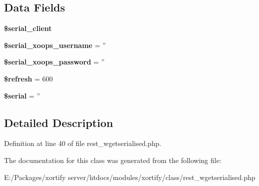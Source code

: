 \subsection*{Data Fields}
\begin{DoxyCompactItemize}
\item 
\hypertarget{class_r_e_s_t___w_g_e_t_s_e_r_i_a_l_i_s_e_d_xortify_exchange_a3fb0b95d3934fcbf11c3ff858232e6cf}{{\bfseries \$serial\-\_\-client}}\label{class_r_e_s_t___w_g_e_t_s_e_r_i_a_l_i_s_e_d_xortify_exchange_a3fb0b95d3934fcbf11c3ff858232e6cf}

\item 
\hypertarget{class_r_e_s_t___w_g_e_t_s_e_r_i_a_l_i_s_e_d_xortify_exchange_a276a5744b88de586eb05b0dce0f6873d}{{\bfseries \$serial\-\_\-xoops\-\_\-username} = ''}\label{class_r_e_s_t___w_g_e_t_s_e_r_i_a_l_i_s_e_d_xortify_exchange_a276a5744b88de586eb05b0dce0f6873d}

\item 
\hypertarget{class_r_e_s_t___w_g_e_t_s_e_r_i_a_l_i_s_e_d_xortify_exchange_a7ac0fbf96eb048ccec682ee45eb3df00}{{\bfseries \$serial\-\_\-xoops\-\_\-password} = ''}\label{class_r_e_s_t___w_g_e_t_s_e_r_i_a_l_i_s_e_d_xortify_exchange_a7ac0fbf96eb048ccec682ee45eb3df00}

\item 
\hypertarget{class_r_e_s_t___w_g_e_t_s_e_r_i_a_l_i_s_e_d_xortify_exchange_a8527f826b6959aaa92b0e51ee427ba1a}{{\bfseries \$refresh} = 600}\label{class_r_e_s_t___w_g_e_t_s_e_r_i_a_l_i_s_e_d_xortify_exchange_a8527f826b6959aaa92b0e51ee427ba1a}

\item 
\hypertarget{class_r_e_s_t___w_g_e_t_s_e_r_i_a_l_i_s_e_d_xortify_exchange_ace465ce9251bb81aa71bcc682c3f08b2}{{\bfseries \$serial} = ''}\label{class_r_e_s_t___w_g_e_t_s_e_r_i_a_l_i_s_e_d_xortify_exchange_ace465ce9251bb81aa71bcc682c3f08b2}

\end{DoxyCompactItemize}


\subsection{Detailed Description}


Definition at line 40 of file rest\-\_\-wgetserialised.\-php.



The documentation for this class was generated from the following file\-:\begin{DoxyCompactItemize}
\item 
E\-:/\-Packages/xortify server/htdocs/modules/xortify/class/rest\-\_\-wgetserialised.\-php\end{DoxyCompactItemize}
